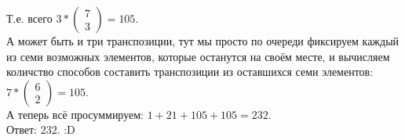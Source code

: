 \documentclass[a4paper,11pt]{report}
\begin{document}
Т.е. всего $3 * 
\begin{pmatrix}
 7\\
 3
\end{pmatrix}
 = 105$.\\
А может быть и три транспозиции, тут мы просто по очереди фиксируем каждый из семи возможных элементов, которые останутся на своём месте,
и вычисляем количство способов составить транспозиции из оставшихся семи элементов: $7 * 
\begin{pmatrix}
6\\
2
\end{pmatrix}
 = 105$.\\
А теперь всё просуммируем: $1 + 21 + 105 + 105 = 232$.\\
Ответ: $232$. :D
\end{document}
